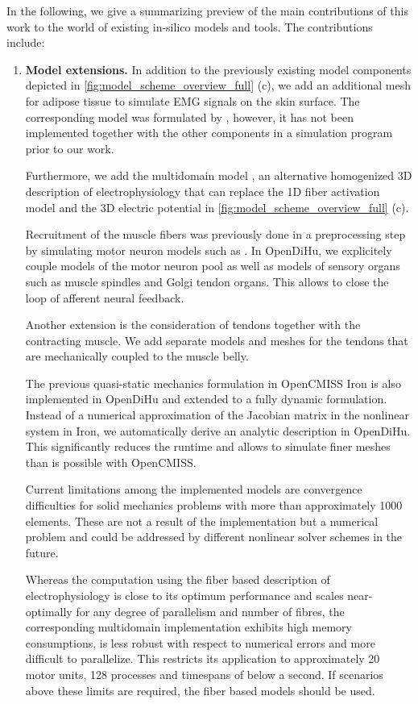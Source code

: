 In the following, we give a summarizing preview of the main contributions of this work to the world of existing in-silico models and tools. The contributions include:
\begin{enumerate}[label=(\roman*)]
  \item \textbf{Model extensions.} In addition to the previously existing model components depicted in \cref{fig:model_scheme_overview_full} (c), we add an additional mesh for adipose tissue to simulate EMG signals on the skin surface. The corresponding model was formulated by \cite{Mordhorst2015}, however, it has not been implemented together with the other components in a simulation program prior to our work.

Furthermore, we add the multidomain model \cite{Klotz2020}, an alternative homogenized 3D description of electrophysiology that can replace the 1D fiber activation model and the 3D electric potential in \cref{fig:model_scheme_overview_full} (c). 

Recruitment of the muscle fibers was previously done in a preprocessing step by simulating motor neuron models such as \cite{Cisi2008,Negro2011}. In OpenDiHu, we explicitely couple models of the motor neuron pool as well as models of sensory organs such as muscle spindles and Golgi tendon organs. This allows to close the loop of afferent neural feedback.

Another extension is the consideration of tendons together with the contracting muscle. We add separate models and meshes for the tendons that are mechanically coupled to the muscle belly.

The previous quasi-static mechanics formulation in OpenCMISS Iron is also implemented in OpenDiHu and extended to a fully dynamic formulation. Instead of a numerical approximation of the Jacobian matrix in the nonlinear system in Iron, we automatically derive an analytic description in OpenDiHu. This significantly reduces the runtime and allows to simulate finer meshes than is possible with OpenCMISS.

Current limitations among the implemented models are convergence difficulties for solid mechanics problems with more than approximately 1000 elements. These are not a result of the implementation but a numerical problem and could be addressed by different nonlinear solver schemes in the future.

Whereas the computation using the fiber based description of electrophysiology is close to its optimum performance and scales near-optimally for any degree of parallelism and number of fibres, the corresponding multidomain implementation exhibits high memory consumptions, is less robust with respect to numerical errors and more difficult to parallelize. This restricts its application to approximately 20 motor units, 128 processes and timespans of below a second. If scenarios above these limits are required, the fiber based models should be used.


\end{enumerate}
